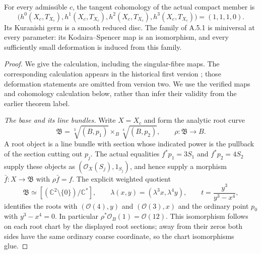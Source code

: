 \begin{theorem}\label{fam:src:A.5.2}\label{fam:st:A.5.2}
For every admissible $c$, the tangent cohomology of the actual compact
member is
\[
 \bigl(h^0(X_c,T_{X_c}),h^1(X_c,T_{X_c}),h^2(X_c,T_{X_c}),
 h^3(X_c,T_{X_c})\bigr)=(1,1,1,0).
\]
Its Kuranishi germ is a smooth reduced disc. The family of A.5.1 is
miniversal at every parameter: its Kodaira--Spencer map is an isomorphism,
and every sufficiently small deformation is induced from this family.
\end{theorem}
\begin{proof}
We give the calculation, including the singular-fibre maps. The
corresponding calculation appears in the historical first version
\cite[Section 6, especially Proposition 6.10, Lemma 6.11,
Theorem 6.12 and Proposition 6.16]{DGKX26v1}; those deformation
statements are omitted from version two. We use the verified maps and
cohomology calculation below, rather than infer their validity from the
earlier theorem label.

\emph{The base and its line bundles.}
Write $X=X_c$ and form the analytic root curve
\[
 \mathfrak B=\sqrt[3]{(B,p_1)}\mathbin{\times_B}\sqrt[4]{(B,p_2)},
 \qquad \rho:\mathfrak B\longrightarrow B.
\]
A root object is a line bundle with section whose indicated power is the
pullback of the section cutting out $p_j$. The actual equalities
$f^*p_1=3S_1$ and $f^*p_2=4S_2$ supply these objects as
$(\mathcal O_X(S_j),1_{S_j})$, and hence supply a morphism
$\bar f:X\to\mathfrak B$ with $\rho\bar f=f$.
The explicit weighted quotient
\[
 \mathfrak B\simeq[(\mathbb C^2\setminus\{0\})/\mathbb C^*],
 \qquad \lambda(x,y)=(\lambda^3x,\lambda^4y),
 \qquad t=\frac{y^3}{y^3-x^4},
\]
identifies the roots with $(\mathcal O(4),y)$ and
$(\mathcal O(3),x)$ and the ordinary point $p_0$ with
$y^3-x^4=0$. In particular $\rho^*\mathcal O_B(1)=\mathcal O(12)$.
This isomorphism follows on each root chart by the displayed root
sections; away from their zeros both sides have the same ordinary coarse
coordinate, so the chart isomorphisms glue.


\end{proof}
